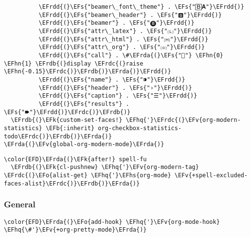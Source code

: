\documentclass[c]{article}
\theoremstyle{plain}%
\theoremstyle{definition}
\theoremstyle{remark}
\newcommand{\EFs}[1]{\textcolor{EFs}{#1}} %
\newcommand{\EFk}[1]{\textcolor{EFk}{#1}} %
\newcommand{\EFb}[1]{\textcolor{EFb}{#1}} %
\newcommand{\EFv}[1]{\textcolor{EFv}{#1}} %
\newcommand{\EFo}[1]{\textcolor{EFo}{#1}} %
\newcommand{\EFhn}[1]{\textcolor{EFhn}{\textbf{#1}}} %
\newcommand{\EFhq}[1]{\textcolor{EFhq}{#1}} %
\newcommand{\EFhs}[1]{\textcolor{EFhs}{#1}} %
\newcommand{\EFrda}[1]{\textcolor{EFrda}{#1}} %
\newcommand{\EFrdb}[1]{\textcolor{EFrdb}{#1}} %
\newcommand{\EFrdc}[1]{\textcolor{EFrdc}{#1}} %
\newcommand{\EFrdd}[1]{\textcolor{EFrdd}{#1}} %
\begin{document}
\begin{Code}
\begin{Verbatim}
          \EFrdd{(}\EFs{"beamer\_font\_theme"} . \EFs{"🄱𝐀"}\EFrdd{)}
          \EFrdd{(}\EFs{"beamer\_header"} . \EFs{"🅱"}\EFrdd{)}
          \EFrdd{(}\EFs{"beamer"} . \EFs{"🅑"}\EFrdd{)}
          \EFrdd{(}\EFs{"attr\_latex"} . \EFs{"🄛"}\EFrdd{)}
          \EFrdd{(}\EFs{"attr\_html"} . \EFs{"🄗"}\EFrdd{)}
          \EFrdd{(}\EFs{"attr\_org"} . \EFs{"⒪"}\EFrdd{)}
          \EFrdd{(}\EFs{"call"} . \#\EFrda{(}\EFs{""} \EFhn{0} \EFhn{1} \EFrdb{(}display \EFrdc{(}raise \EFhn{-0.15}\EFrdc{)}\EFrdb{)}\EFrda{)}\EFrdd{)}
          \EFrdd{(}\EFs{"name"} . \EFs{"⁍"}\EFrdd{)}
          \EFrdd{(}\EFs{"header"} . \EFs{"›"}\EFrdd{)}
          \EFrdd{(}\EFs{"caption"} . \EFs{"☰"}\EFrdd{)}
          \EFrdd{(}\EFs{"results"} . \EFs{"🠶"}\EFrdd{)}\EFrdc{)}\EFrdb{)}
  \EFrdb{(}\EFk{custom-set-faces!} \EFhq{'}\EFrdc{(}\EFv{org-modern-statistics} \EFb{:inherit} org-checkbox-statistics-todo\EFrdc{)}\EFrdb{)}\EFrda{)}
\EFrda{(}\EFv{global-org-modern-mode}\EFrda{)}
\end{Verbatim}
\end{Code}
\begin{Code}
\begin{Verbatim}
\color{EFD}\EFrda{(}\EFk{after!} spell-fu
  \EFrdb{(}\EFk{cl-pushnew} \EFhq{'}\EFv{org-modern-tag} \EFrdc{(}\EFo{alist-get} \EFhq{'}\EFhs{org-mode} \EFv{+spell-excluded-faces-alist}\EFrdc{)}\EFrdb{)}\EFrda{)}
\end{Verbatim}
\end{Code}
\subsubsection{General}
\label{sec:orgea2888a}
\begin{Code}
\begin{Verbatim}
\color{EFD}\EFrda{(}\EFo{add-hook} \EFhq{'}\EFv{org-mode-hook} \EFhq{\#'}\EFv{+org-pretty-mode}\EFrda{)}
\end{Verbatim}
\end{Code}
\end{document}
